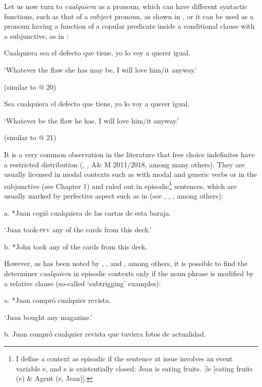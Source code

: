 \documentclass[output=paper]{langscibook}
\begin{document}
  Let us now turn to \textit{cualquiera} as a pronoun, which can have different syntactic functions, such as that of a subject pronoun, as shown in , or it can be used as a pronoun having a function of a copular predicate inside a conditional clause with a subjunctive, as in :

\label{bkm:Ref533761017}  Cualquiera sea el defecto que tiene, yo lo voy a querer igual.

  ‘Whatever the flaw she has may be, I will love him/it anyway.’

  (similar to @ 20)

\label{bkm:Ref533761034}  Sea cualquiera el defecto que tiene, yo lo voy a querer igual.

  ‘Whatever be the flaw he has, I will love him/it anyway.’

  (similar to @ 21)

It is a very common observation in the literature that free choice indefinites have a restricted distribution (\citealt{Quer2000}, \citealt{Menéndez-Benito2010}, A\& M 2011/2018, among many others). They are usually licensed in modal contexts such as with modal and generic verbs or in the subjunctive (see Chapter 1) and ruled out in episodic\footnote{ \textrm{I define a context as episodic if the sentence at issue involves an event variable e, and e is existentially closed: Jean is eating fruits. ${\exists}$e [eating fruits (e) \& Agent (e, Jean)].}} sentences, which are usually marked by perfective aspect such as in  (see \citealt{Menéndez-Benito2010}, \citealt{AloniEtAl2010}, \citealt{Dayal2013}, among others):

\label{bkm:Ref41139913}  a.  *Juan cogió cualquiera de las cartas de esta baraja.

    ‘Juan took-\textsc{pfv} any of the cards from this deck.’

  b.  *John took any of the cards from this deck. 

    \citep[34]{Menéndez-Benito2010}

However, as has been noted by \citet{Quer2000}, \citet{Rivero2011}, and \citet{Menéndez-Benito2010}, among others, it is possible to find the determiner \textit{cualquiera} in episodic contexts only if the noun phrase is modified by a relative clause (so-called ‘subtrigging’ examples):

\label{bkm:Ref41139369}  a.  *Juan compró cualquier revista.

    ‘Juan bought any magazine.’

  b.  Juan compró cualquier revista que tuviera fotos de actualidad.
\end{document}
